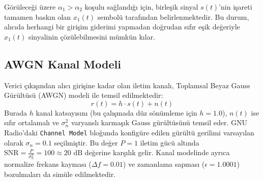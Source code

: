 Görüleceği üzere $\alpha_1 > \alpha_2$ koşulu sağlandığı için, birleşik sinyal $s(t)$'nin işareti tamamen baskın olan $x_1(t)$ sembolü tarafından belirlenmektedir. Bu durum, alıcıda herhangi bir girişim giderimi yapmadan doğrudan sıfır eşik değeriyle $x_1(t)$ sinyalinin çözülebilmesini mümkün kılar.

\subsection{AWGN Kanal Modeli}
Verici çıkışından alıcı girişine kadar olan iletim kanalı, Toplamsal Beyaz Gauss Gürültüsü (AWGN) modeli ile temsil edilmektedir:
\begin{equation}
r(t) = h \cdot s(t) + n(t)
\end{equation}
Burada $h$ kanal katsayısını (bu çalışmada düz sönümleme için $h = 1.0$), $n(t)$ ise sıfır ortalamalı ve $\sigma_n^2$ varyanslı karmaşık Gauss gürültüsünü temsil eder. GNU Radio'daki \texttt{Channel Model} bloğunda konfigüre edilen gürültü gerilimi varsayılan olarak $\sigma_n = 0.1$ seçilmiştir. Bu değer $P=1$ iletim gücü altında $\text{SNR} = \frac{P}{\sigma_n^2} = 100 \approx 20\text{ dB}$ değerine karşılık gelir. Kanal modelinde ayrıca normalize frekans kayması ($\Delta f = 0.01$) ve zamanlama sapması ($\epsilon = 1.0001$) bozulmaları da simüle edilmektedir.

